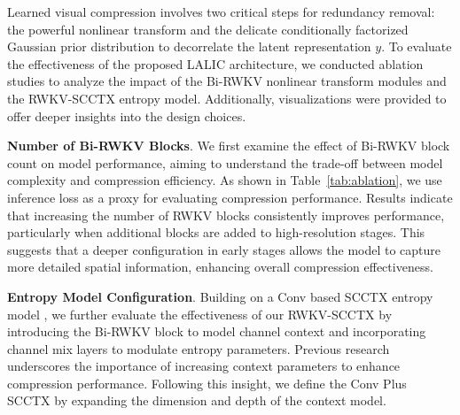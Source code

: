 
Learned visual compression involves two critical steps for redundancy removal: the powerful nonlinear transform and the delicate conditionally factorized Gaussian prior distribution to decorrelate the latent representation \( y \). To evaluate the effectiveness of the proposed LALIC architecture, we conducted ablation studies to analyze the impact of the Bi-RWKV nonlinear transform modules and the RWKV-SCCTX entropy model. Additionally, visualizations were provided to offer deeper insights into the design choices. 



\noindent\textbf{Number of Bi-RWKV Blocks}. We first examine the effect of Bi-RWKV block count on model performance, aiming to understand the trade-off between model complexity and compression efficiency. As shown in Table~\ref{tab:ablation}, we use inference loss as a proxy for evaluating compression performance. Results indicate that increasing the number of RWKV blocks consistently improves performance, particularly when additional blocks are added to high-resolution stages. This suggests that a deeper configuration in early stages allows the model to capture more detailed spatial information, enhancing overall compression effectiveness.

\noindent\textbf{Entropy Model Configuration}. Building on a Conv based SCCTX entropy model \cite{He.2022.ELIC}, we further evaluate the effectiveness of our RWKV-SCCTX by introducing the Bi-RWKV block to model channel context and incorporating channel mix layers to modulate entropy parameters. Previous research \cite{Sheng.2024.NVC1B} underscores the importance of increasing context parameters to enhance compression performance. Following this insight, we define the Conv Plus SCCTX by expanding the dimension and depth of the context model. 

